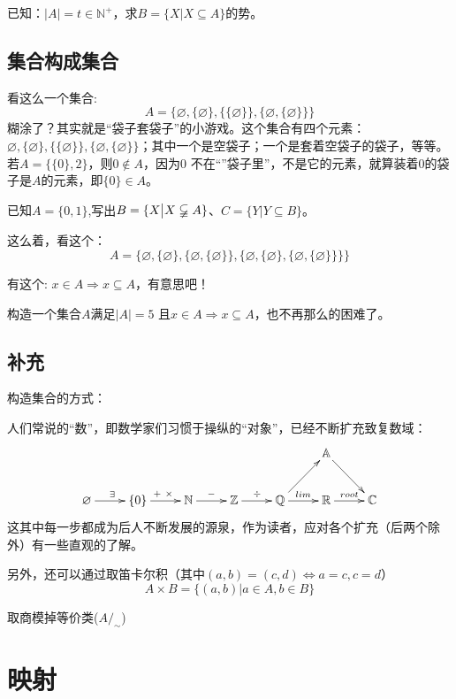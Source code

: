 \documentclass[UTF8]{ctexart}
\begin{document}
已知：$|A|=t \in \mathbb{N}^+$，求$B=\{X \big| X \subseteq A \}$的势。

\subsection{集合构成集合}

看这么一个集合:$$A=\Big\{ \varnothing , \big\{ \varnothing\big\} ,\big\{\{ \varnothing\}\big\} , \big\{ \varnothing , \{ \varnothing\} \big\}\Big\}$$ 糊涂了？其实就是“袋子套袋子”的小游戏。这个集合有四个元素：$ \varnothing , \big\{ \varnothing\big\} ,\big\{\{ \varnothing\}\big\} , \big\{ \varnothing , \{ \varnothing\} \big\}$；其中一个是空袋子；一个是套着空袋子的袋子，等等。若$A=\big\{ \{0\} , 2 \big\}$，则$0 \notin A$，因为0 不在“”袋子里”，不是它的元素，就算装着0的袋子是$A$的元素，即$ \{0\} \in A$。

已知$A=\{ 0, 1\}$,写出$B=\{X \big| X\varsubsetneqq A \}$、$C=\{Y \big| Y \subseteq B \}$。

这么着，看这个：
$$
A=\Big\{ \varnothing , \big\{ \varnothing\big\} , \big\{ \varnothing , \{ \varnothing\} \big\} , \big\{ \varnothing ,\{ \varnothing\} , \{ \varnothing , \{ \varnothing\}\} \big\} \Big\}
$$

有这个: $x\in A \Rightarrow x \subseteq A$，有意思吧！

构造一个集合$A$满足$|A|=5$ 且$x\in A \Rightarrow x \subseteq A$，也不再那么的困难了。

\subsection{补充}

构造集合的方式：

人们常说的“数”，即数学家们习惯于操纵的“对象”，已经不断扩充致复数域：
$$
\xymatrix{
 & & & & & \mathbb{A} \ar[rd] & \\
\varnothing \ar[r]^{\exists} & \lbrace 0 \rbrace \ar[r]^{+ \ \times} & \mathbb{N} \ar[r]^{-} & \mathbb{Z} \ar[r]^{\div} & \mathbb{Q} \ar[r]^{lim} \ar[ru] & \mathbb{R} \ar[r]^{root} & \mathbb{C}
}
$$
这其中每一步都成为后人不断发展的源泉，作为读者，应对各个扩充（后两个除外）有一些直观的了解。

另外，还可以通过取笛卡尔积（其中$(a,b)=(c,d) \Leftrightarrow a=c,c=d$）
$$
A \times B= \big\{(a,b)\big|a\in A,b\in B \big\}
$$

取商模掉等价类($A/_\sim$)

\section{映射}
\end{document}
